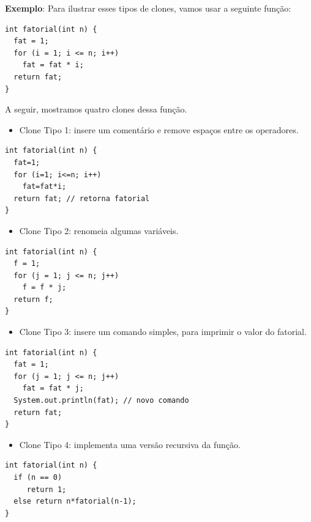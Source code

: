 \documentclass[
  11pt,
  twoside]{book}
\providecommand{\tightlist}{%
  \setlength{\itemsep}{0pt}\setlength{\parskip}{0pt}}
\begin{document}
\textbf{Exemplo}: Para ilustrar esses tipos de clones, vamos usar a
seguinte função:

\begin{lstlisting}
int fatorial(int n) {
  fat = 1;
  for (i = 1; i <= n; i++)
    fat = fat * i;
  return fat;
}
\end{lstlisting}

A seguir, mostramos quatro clones dessa função.

\begin{itemize}
\tightlist
\item
  Clone Tipo 1: insere um comentário e remove espaços entre os
  operadores.
\end{itemize}

\begin{lstlisting}
int fatorial(int n) {
  fat=1;
  for (i=1; i<=n; i++) 
    fat=fat*i;
  return fat; // retorna fatorial
}
\end{lstlisting}

\begin{itemize}
\tightlist
\item
  Clone Tipo 2: renomeia algumas variáveis.
\end{itemize}

\begin{lstlisting}
int fatorial(int n) {
  f = 1;
  for (j = 1; j <= n; j++) 
    f = f * j;
  return f; 
}
\end{lstlisting}

\begin{itemize}
\tightlist
\item
  Clone Tipo 3: insere um comando simples, para imprimir o valor do
  fatorial.
\end{itemize}

\begin{lstlisting}
int fatorial(int n) {
  fat = 1;
  for (j = 1; j <= n; j++)
    fat = fat * j;
  System.out.println(fat); // novo comando
  return fat;
}
\end{lstlisting}

\begin{itemize}
\tightlist
\item
  Clone Tipo 4: implementa uma versão recursiva da função.
\end{itemize}

\begin{lstlisting}
int fatorial(int n) {
  if (n == 0)
     return 1;
  else return n*fatorial(n-1);
}
\end{lstlisting}
\end{document}

